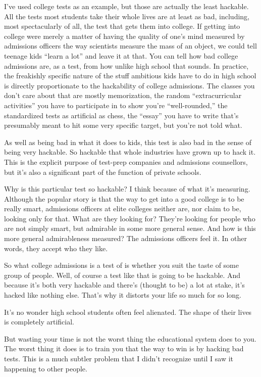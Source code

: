 \documentclass[12pt]{book}
\begin{document}
I've used college tests as an example, but those are actually the least
hackable. All the tests most students take their whole lives are at
least as bad, including, most spectacularly of all, the test that gets
them into college. If getting into college were merely a matter of
having the quality of one's mind measured by admissions officers the way
scientists measure the mass of an object, we could tell teenage kids
``learn a lot'' and leave it at that. You can tell how bad college
admissions are, as a test, from how unlike high school that sounds. In
practice, the freakishly specific nature of the stuff ambitious kids
have to do in high school is directly proportionate to the hackability
of college admissions. The classes you don't care about that are mostly
memorization, the random ``extracurricular activities'' you have to
participate in to show you're ``well-rounded,'' the standardized tests
as artificial as chess, the ``essay'' you have to write that's
presumably meant to hit some very specific target, but you're not told
what.

As well as being bad in what it does to kids, this test is also bad in
the sense of being very hackable. So hackable that whole industries have
grown up to hack it. This is the explicit purpose of test-prep companies
and admissions counsellors, but it's also a significant part of the
function of private schools.

Why is this particular test so hackable? I think because of what it's
measuring. Although the popular story is that the way to get into a good
college is to be really smart, admissions officers at elite colleges
neither are, nor claim to be, looking only for that. What are they
looking for? They're looking for people who are not simply smart, but
admirable in some more general sense. And how is this more general
admirableness measured? The admissions officers feel it. In other words,
they accept who they like.

So what college admissions is a test of is whether you suit the taste of
some group of people. Well, of course a test like that is going to be
hackable. And because it's both very hackable and there's (thought to
be) a lot at stake, it's hacked like nothing else. That's why it
distorts your life so much for so long.

It's no wonder high school students often feel alienated. The shape of
their lives is completely artificial.

But wasting your time is not the worst thing the educational system does
to you. The worst thing it does is to train you that the way to win is
by hacking bad tests. This is a much subtler problem that I didn't
recognize until I saw it happening to other people.
\end{document}
